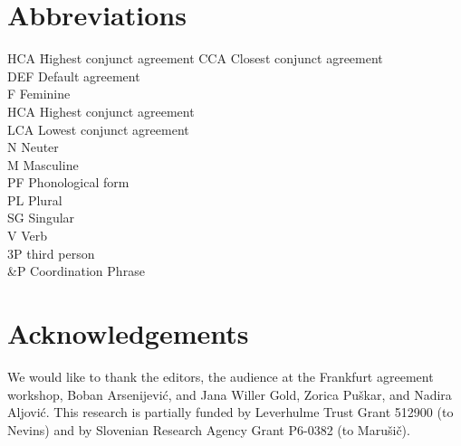 \documentclass[output=paper
,modfonts
,nonflat]{langsci/langscibook}
\begin{document}

\section*{Abbreviations}

\begin{multicols}{2}
	\begin{tabbing}
		{HCA}\hspace{2\tabcolsep} \= Highest conjunct agreement\kill
CCA \> Closest conjunct agreement\\
DEF \> Default agreement\\
F \> Feminine\\
HCA \> Highest conjunct agreement\\
LCA \> Lowest conjunct agreement\\
N \> Neuter\\
M \> Masculine\\
PF \> Phonological form\\
PL \> Plural\\
SG \> Singular\\
V \> Verb\\
3P \> third person\\
\&P \> Coordination Phrase
	\end{tabbing} 
\end{multicols}

\section*{Acknowledgements}
We would like to thank the editors, the audience at the Frankfurt agreement workshop, Boban Arsenijević, and Jana Willer Gold, Zorica Puškar, and Nadira Aljović. This research is partially funded by Leverhulme Trust Grant 512900 (to Nevins) and by Slovenian Research Agency Grant P6-0382 (to Marušič). 


{\sloppy\printbibliography[heading=subbibliography,notkeyword=this]}
\end{document}
